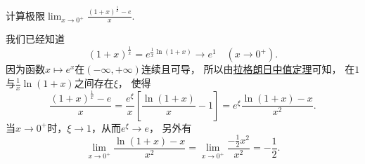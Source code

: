 \begin{example}
计算极限\(\lim_{x\to0^+} \frac{(1+x)^{\frac1x} - e}{x}\).
\begin{solution}
我们已经知道\[
	(1+x)^{\frac1x}
	= e^{\frac1x \ln(1+x)}
	\to e^1
	\quad(x\to0^+).
\]
因为函数\(x \mapsto e^x\)在\((-\infty,+\infty)\)连续且可导，
所以由\hyperref[theorem:微分中值定理.拉格朗日中值定理]{拉格朗日中值定理}可知，
在\(1\)与\(\frac1x \ln(1+x)\)之间存在\(\xi\)，
使得\[
	\frac{(1+x)^{\frac1x} - e}{x}
	= \frac{e^\xi}{x} \left[ \frac{\ln(1+x)}{x} - 1 \right]
	= e^\xi \frac{\ln(1+x) - x}{x^2}.
\]
当\(x\to0^+\)时，\(\xi\to1\)，从而\(e^\xi \to e\)，
另外有\[
	\lim_{x\to0^+} \frac{\ln(1+x) - x}{x^2}
	= \lim_{x\to0^+} \frac{-\frac12 x^2}{x^2}
	= -\frac12.
\]
\end{solution}
\end{example}

